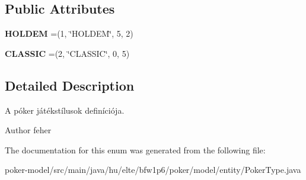 \subsection*{Public Attributes}
\begin{DoxyCompactItemize}
\item 
\hypertarget{enumhu_1_1elte_1_1bfw1p6_1_1poker_1_1model_1_1entity_1_1_poker_type_af4b4a6dfc6fa40bcac30dcf97fe15bfc}{}{\bfseries H\+O\+L\+D\+E\+M} =(1, \char`\"{}H\+O\+L\+D\+E\+M\char`\"{}, 5, 2)\label{enumhu_1_1elte_1_1bfw1p6_1_1poker_1_1model_1_1entity_1_1_poker_type_af4b4a6dfc6fa40bcac30dcf97fe15bfc}

\item 
\hypertarget{enumhu_1_1elte_1_1bfw1p6_1_1poker_1_1model_1_1entity_1_1_poker_type_a0060cf060c76126c95a4b24d462fe5c1}{}{\bfseries C\+L\+A\+S\+S\+I\+C} =(2, \char`\"{}C\+L\+A\+S\+S\+I\+C\char`\"{}, 0, 5)\label{enumhu_1_1elte_1_1bfw1p6_1_1poker_1_1model_1_1entity_1_1_poker_type_a0060cf060c76126c95a4b24d462fe5c1}

\end{DoxyCompactItemize}


\subsection{Detailed Description}
A póker játékstílusok definíciója. \begin{DoxyAuthor}{Author}
feher 
\end{DoxyAuthor}


The documentation for this enum was generated from the following file\+:\begin{DoxyCompactItemize}
\item 
poker-\/model/src/main/java/hu/elte/bfw1p6/poker/model/entity/Poker\+Type.\+java\end{DoxyCompactItemize}
